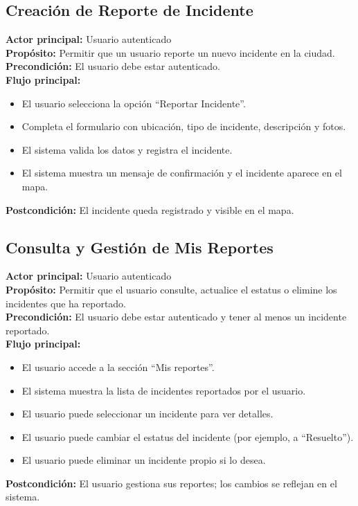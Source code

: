 \subsection{Creación de Reporte de Incidente}
\textbf{Actor principal:} Usuario autenticado\\
\textbf{Propósito:} Permitir que un usuario reporte un nuevo incidente en la ciudad.\\
\textbf{Precondición:} El usuario debe estar autenticado.\\
\textbf{Flujo principal:}
\begin{itemize}
    \item El usuario selecciona la opción ``Reportar Incidente''.
    \item Completa el formulario con ubicación, tipo de incidente, descripción y fotos.
    \item El sistema valida los datos y registra el incidente.
    \item El sistema muestra un mensaje de confirmación y el incidente aparece en el mapa.
\end{itemize}
\textbf{Postcondición:} El incidente queda registrado y visible en el mapa.

\subsection{Consulta y Gestión de Mis Reportes}
\textbf{Actor principal:} Usuario autenticado\\
\textbf{Propósito:} Permitir que el usuario consulte, actualice el estatus o elimine los incidentes que ha reportado.\\
\textbf{Precondición:} El usuario debe estar autenticado y tener al menos un incidente reportado.\\
\textbf{Flujo principal:}
\begin{itemize}
    \item El usuario accede a la sección ``Mis reportes''.
    \item El sistema muestra la lista de incidentes reportados por el usuario.
    \item El usuario puede seleccionar un incidente para ver detalles.
    \item El usuario puede cambiar el estatus del incidente (por ejemplo, a ``Resuelto'').
    \item El usuario puede eliminar un incidente propio si lo desea.
\end{itemize}
\textbf{Postcondición:} El usuario gestiona sus reportes; los cambios se reflejan en el sistema.


